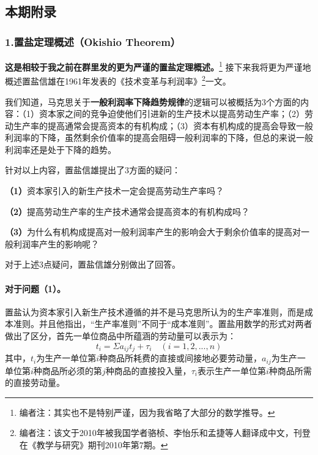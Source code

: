 \documentclass[a4paper,twoside,12pt,AutoFakeBold]{ctexart}
\begin{document}
\newpage
\subsection{本期附录}
\subsubsection{1.置盐定理概述（Okishio Theorem）}
\noindent\textbf{这是相较于我之前在群里发的更为严谨的置盐定理概述。}\footnote{编者注：其实也不是特别严谨，因为我省略了大部分的数学推导。} 接下来我将更为严谨地概述置盐信雄在1961年发表的《技术变革与利润率》\footnote{编者注：该文于2010年被我国学者骆桢、李怡乐和孟捷等人翻译成中文，刊登在《教学与研究》期刊2010年第7期。}一文。

\vspace{0.5cm} %

我们知道，马克思关于\textbf{一般利润率下降趋势规律}的逻辑可以被概括为3个方面的内容：（1）资本家之间的竞争迫使他们引进新的生产技术以提高劳动生产率；（2）劳动生产率的提高通常会提高资本的有机构成；（3）资本有机构成的提高会导致一般利润率的下降，虽然剩余价值率的提高会阻碍一般利润率的下降，但总的来说一般利润率还是处于下降的趋势。

针对以上内容，置盐信雄提出了3方面的疑问：
\begin{tcolorbox}[colback=gray!20, colframe=gray!100, sharp corners, leftrule={3pt}, rightrule={0pt}, toprule={0pt}, bottomrule={0pt}, left={2pt}, right={2pt}, top={3pt}, bottom={3pt}] 
\textbf{（1）}资本家引入的新生产技术一定会提高劳动生产率吗？

\textbf{（2）}提高劳动生产率的生产技术通常会提高资本的有机构成吗？

\textbf{（3）}为什么有机构成提高对一般利润率产生的影响会大于剩余价值率的提高对一般利润率产生的影响呢？

\end{tcolorbox}


对于上述3点疑问，置盐信雄分别做出了回答。

\paragraph{对于问题（1）。}置盐认为资本家引入新生产技术遵循的并不是马克思所认为的生产率准则，而是成本准则。并且他指出，“生产率准则”不同于“成本准则”。置盐用数学的形式对两者做出了区分，首先一单位商品中所蕴涵的劳动量可以表示为：
\begin{equation}\tag{1}
    t_i=\Sigma a_{ij}t_j+\tau_i \quad (i=1,2,...,n)
\end{equation}
其中，$t_i$为生产一单位第$i$种商品所耗费的直接或间接地必要劳动量，$a_{ij}$为生产一单位第$i$种商品所必须的第$j$种商品的直接投入量，$\tau_i$表示生产一单位第$i$种商品所需的直接劳动量。
\end{document}
